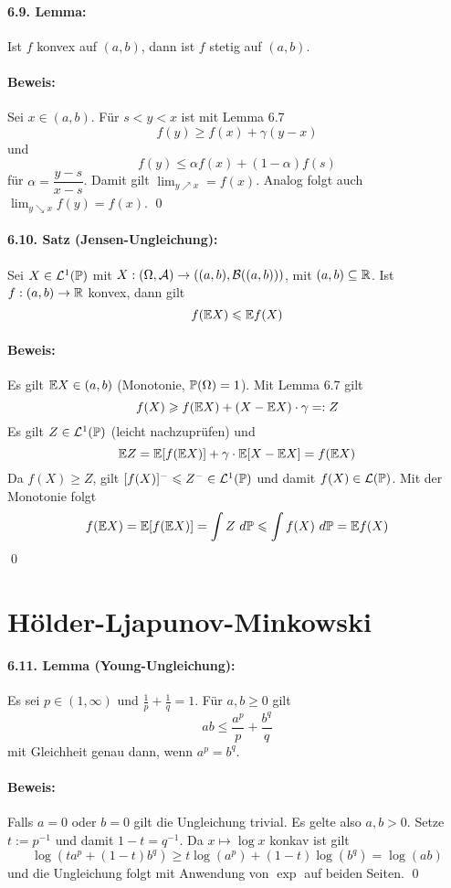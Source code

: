 \documentclass[12pt]{report}
\begin{document}
 \paragraph{6.9. Lemma:}Ist $f$ konvex auf $(a,b)$, dann ist $f$ stetig auf $(a,b)$.
 
 \paragraph{Beweis:}Sei $x\in(a,b)$. F\"ur $s<y<x$ ist mit Lemma 6.7
 $$f(y)\geq f(x)+\gamma (y-x)$$
 und 
 $$f(y)\leq \alpha f(x)+(1-\alpha)f(s)$$
 f\"ur $\alpha=\dfrac{y-s}{x-s}$. Damit gilt $\displaystyle\lim_{y\nearrow x}=f(x)$. Analog folgt auch $\lim_{y\searrow x}f(y)=f(x)$. \qed
 
 \paragraph{6.10. Satz (Jensen-Ungleichung):}Sei $X\in\mathcal{L}^1(\mathbb{P})$ mit $X:(\Omega,\mathcal{A})\to((a,b),\mathcal{B}((a,b)))$, mit $(a,b)\subseteq\mathbb{R}$. Ist $f:(a,b)\to\mathbb{R}$ konvex, dann gilt
 $$f(\mathbb{E} X)\leqslant \mathbb{E} f(X)$$
 
 \paragraph{Beweis:}Es gilt $\mathbb{E} X\in (a,b)$ (Monotonie, $\mathbb{P}(\Omega)=1$). Mit Lemma 6.7 gilt
 $$f(X)\geqslant f(\mathbb{E} X)+(X-\mathbb{E} X)\cdot \gamma=:Z$$
 Es gilt $Z\in\mathcal{L}^1(\mathbb{P})$ (leicht nachzupr\"ufen) und 
 $$\mathbb{E} Z=\mathbb{E}[f(\mathbb{E} X)]+\gamma\cdot \mathbb{E}[X-\mathbb{E} X]=f(\mathbb{E} X)$$
 Da $f(X)\geq Z$, gilt $[f(X)]^-\leqslant Z^-\in\mathcal{L}^1(\mathbb{P})$ und damit $f(X)\in\mathcal{L}(\mathbb{P})$. Mit der Monotonie folgt 
 $$f(\E X)=\E[f(\E X)]=\int Z\ d\Pp\leq\int f(X)\ d\Pp=\E f(X)$$
 \qed
 
\section*{H\"older-Ljapunov-Minkowski}

\paragraph{6.11. Lemma (Young-Ungleichung):} Es sei $p\in(1,\infty)$ und $\frac{1}{p}+\frac{1}{q}=1$. Für $a,b\geq0$ gilt
$$ab\leq\dfrac{a^p}{p}+\dfrac{b^q}{q}$$
mit Gleichheit genau dann, wenn $a^p=b^q$.

\paragraph{Beweis:}Falls $a=0$ oder $b=0$ gilt die Ungleichung trivial. Es gelte also $a,b>0$. Setze $t:=p^{-1}$ und damit $1-t=q^{-1}$. Da $x\mapsto \log x$ konkav ist gilt
$$\log\left(ta^p+(1-t)b^q\right)\geq t\log\left(a^p\right)+(1-t)\log\left(b^q\right)=\log(ab)$$
und die Ungleichung folgt mit Anwendung von $\exp$ auf beiden Seiten. \qed
\end{document}
